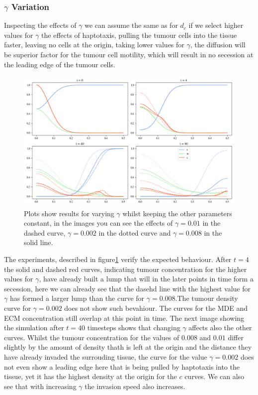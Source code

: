 \subsubsection*{$\gamma$ Variation}
Inspecting the effects of $\gamma$ we can assume the same as for $d_c$ if we select higher values for $\gamma$ the effects of haptotaxis, pulling the tumour cells into the tissue faster, leaving no cells at the origin, taking lower values for $\gamma$, the diffusion will be superior factor for the tumour cell motility, which will result in no secession at the leading edge of the tumour cells.
\begin{figure}[h]
    \centering
    \includegraphics[width=\textwidth]{resources/images/gamma_variation.png}
    \caption{Plots show results for varying $\gamma$ whilst keeping the other parameters constant, in the images you can see the effects of $\gamma=0.01$ in the dashed curve, $\gamma=0.002$ in the dotted curve and $\gamma=0.008$ in the solid line.}
    \label{fig:gamma_variation}
\end{figure}
The experiments, described in figure\ref{fig:gamma_variation} verify the expected behaviour. After $t=4$ the solid and dashed red curves, indicating tumour concentration for the higher values for $\gamma$, have already built a lump that will in the later points in time form a secession, here we can already see that the dasehd line with the highest value for $\gamma$ has formed a larger lump than the curve for $\gamma=0.008$.The tumour density curve for $\gamma=0.002$ does not show such bevahiour. The curves for the MDE and ECM concentration still overlap at this point in time. The next image showing the simulation after $t=40$ timesteps shows that changing $\gamma$ affects also the other curves. Whilst the tumour concentration for the values of $0.008$ and $0.01$ differ slightly by the amount of density thath is left at the origin and the distance they have already invaded the surrouding tissue, the curve for the value $\gamma=0.002$ does not even show a leading edge here that is being pulled by haptotaxis into the tissue, yet it has the highest density at the origin for the $c$ curves. We can also see that with increasing $\gamma$ the invasion speed also increases. 
